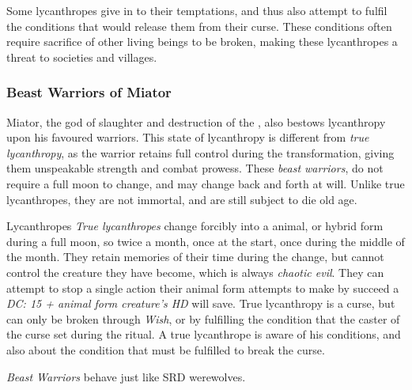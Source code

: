 Some lycanthropes give in to their temptations, and thus also attempt to
fulfil the conditions that would release them from their curse. These
conditions often require sacrifice of other living beings to be broken, making
these lycanthropes a threat to societies and villages.

\subsubsection{Beast Warriors of Miator}
\label{sec:Beast Warriors}

Miator, the god of slaughter and destruction of the ,
also bestows lycanthropy upon his favoured warriors. This state of lycanthropy
is different from \emph{true lycanthropy}, as the warrior retains full control
during the transformation, giving them unspeakable strength and combat prowess.
These \emph{beast warriors}, do not require a full moon to change, and may
change back and forth at will. Unlike true lycanthropes, they are not immortal,
and are still subject to die old age.

\begin{35e}{Lycanthropes}
  \emph{True lycanthropes} change forcibly into a animal, or hybrid form
  during a full moon, so twice a month, once at the start, once during the
  middle of the month. They retain memories of their time during the
  change, but cannot control the creature they have become, which is always
  \emph{chaotic evil}. They can attempt to stop a single action their animal
  form attempts to make by succeed a \emph{DC: 15 + animal form creature's HD}
  will save. True lycanthropy is a curse, but can only be broken through
  \emph{Wish}, or by fulfilling the condition that the caster of the curse set
  during the ritual. A true lycanthrope is aware of his conditions, and also
  about the condition that must be fulfilled to break the curse.

  \emph{Beast Warriors} behave just like SRD werewolves.
\end{35e}
